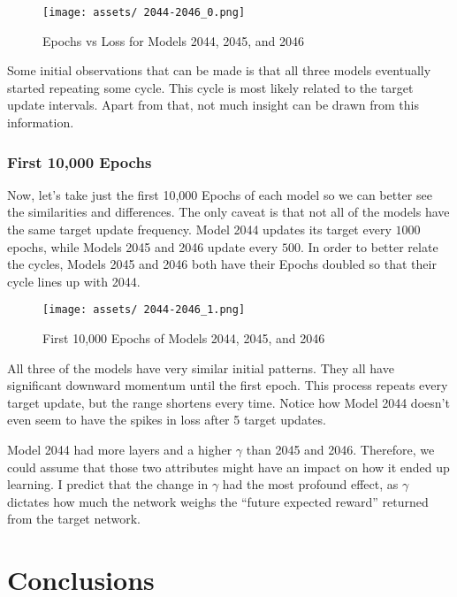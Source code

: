 \documentclass[12pt]{article}
\begin{document}
\begin{figure}[h]
	\centering
	\caption{Epochs vs Loss for Models 2044, 2045, and 2046}
	\texttt{[image: assets/ 2044-2046\_0.png]}
\end{figure}

Some initial observations that can be made is that all three models eventually started repeating some cycle. This cycle is most likely related to the target update intervals. Apart from that, not much insight can be drawn from this information.

\newpage

\subsubsection{First 10,000 Epochs}

Now, let's take just the first 10,000 Epochs of each model so we can better see the similarities and differences. The only caveat is that not all of the models have the same target update frequency. Model 2044 updates its target every $1000$ epochs, while Models 2045 and 2046 update every $500$. In order to better relate the cycles, Models 2045 and 2046 both have their Epochs doubled so that their cycle lines up with 2044.


\begin{figure}[h]
	\centering
	\caption{First 10,000 Epochs of Models 2044, 2045, and 2046}
	\texttt{[image: assets/ 2044-2046\_1.png]}
\end{figure}

All three of the models have very similar initial patterns. They all have significant downward momentum until the first epoch. This process repeats every target update, but the range shortens every time. Notice how Model 2044 doesn't even seem to have the spikes in loss after 5 target updates. 

Model 2044 had more layers and a higher $\gamma$ than 2045 and 2046. Therefore, we could assume that those two attributes might have an impact on how it ended up learning. I predict that the change in $\gamma$ had the most profound effect, as $\gamma$ dictates how much the network weighs the ``future expected reward'' returned from the target network. 

\section{Conclusions}
\end{document}

